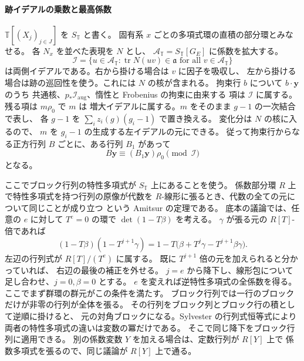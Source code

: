 \paragraph{跡イデアルの乗数と最高係数}
\(\mathbb T[(X_j)_{j\in J}]\) を \(S_{\mathbb T}\) と書く。
固有系 \(x\) ごとの多項式環の直積の部分環とみなせる。
各 \(N_x\) を並べた表現を \(N\) とし、
\(\mathcal A_{\mathbb T}=S_{\mathbb T}[G_E]\) に係数を拡大する。
\[
 \mathscr I=\{u\in\mathcal A_{\mathbb T}:
         \operatorname{tr}N(uv)\in\mathfrak a
         \text{ for all }v\in\mathcal A_{\mathbb T}\}
\]
は両側イデアルである。右から掛ける場合は \(v\) に因子を吸収し、
左から掛ける場合は跡の巡回性を使う。これには \(N\) の核が含まれる。
拘束行 \(b\) について \(b\cdot\mathbf y\) のうち
共通核、\(p_\ast\mathcal I_\mathrm{aug}\)、惰性と Frobenius の拘束に由来する
項は \(\mathscr I\) に属する。残る項は \(m\rho_0\) で \(m\) は
増大イデアルに属する。\(m\) をそのまま \(g-1\) の一次結合で表し、
各 \(g-1\) を \(\sum_i z_i(g)(g_i-1)\) で置き換える。
変化分は \(N\) の核に入るので、
\(m\) を \(g_i-1\) の生成する左イデアルの元にできる。
従って拘束行からなる正方行列 \(B\) ごとに、ある行列 \(B_1\) があって
\[
 B\mathbf y\equiv (B_1\mathbf y)\rho_0\pmod{\mathscr I}
\]
となる。

ここでブロック行列の特性多項式が \(S_{\mathbb T}\) 上にあることを使う。
係数部分環 \(R\) 上で特性多項式を持つ行列の原像が代数を
\(R\)-線形に張るとき、代数の全ての元について同じことが成り立つ
という Amitsur の定理である。
底本の議論では、任意の \(e\) に対して \(T^e=0\) の環で
\(\det(1-T\beta)\) を考える。
\(\gamma\) が張る元の \(R[T]\)-倍であれば
\[
 (1-T\beta)(1-T^{j+1}\gamma)
   =1-T\bigl(\beta+T^j\gamma-T^{j+1}\beta\gamma\bigr).
\]
左辺の行列式が \(R[T]/(T^e)\) に属する。
既に \(T^{j+1}\) 倍の元を加えられると分かっていれば、
右辺の最後の補正を外せる。
\(j=e\) から降下し、線形包について足し合わせ、\(j=0,\beta=0\) とする。
\(e\) を変えれば逆特性多項式の全係数を得る。
ここでまず群環の群元がこの条件を満たす。
ブロック行列では一行のブロックだけが非零の行列が全体を張る。
その行列をブロック列とブロック行の積として逆順に掛けると、
元の対角ブロックになる。Sylvester の行列式恒等式により
両者の特性多項式の違いは変数の冪だけである。
そこで同じ降下をブロック行列に適用できる。
別の係数変数 \(Y\) を加える場合は、定数行列が \(R[Y]\) 上で
係数多項式を張るので、同じ議論が \(R[Y]\) 上で通る。

